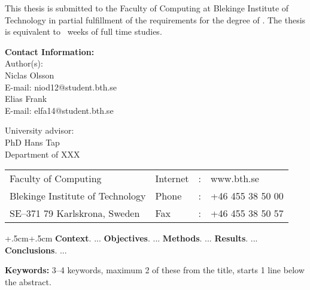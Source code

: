 \documentclass[a4paper,oneside]{bth}
\begin{document}
{\pagestyle{empty}
\changepage{5cm}{1cm}{-0.5cm}{-0.5cm}{}{-2cm}{}{}{}
\noindent
{\small
This thesis is submitted to the Faculty of Computing at Blekinge Institute
of Technology in partial fulfillment of the requirements for the degree of
\thesisDegree. The thesis is equivalent to \thesisWeeks\ 
weeks of full time studies.
}

\vspace{15cm}

\noindent
\textbf{Contact Information:} \\
Author(s): \\
Niclas Olsson \\
E-mail: niod12@student.bth.se \\
Elias Frank \\
E-mail: elfa14@student.bth.se

\vspace{2cm}

\noindent
University advisor: \\
PhD Hans Tap \\
Department of XXX


\vspace*{\fill}

\noindent
\begin{tabular}{@{}p{} l c l}
Faculty of Computing             & Internet & : & www.bth.se \\
Blekinge Institute of Technology & Phone    & : & +46 455 38 50 00 \\
SE--371 79 Karlskrona, Sweden    & Fax      & : & +46 455 38 50 57 \\
\end{tabular}
\clearpage
} %

\setcounter{page}{1}

\abstract
\begin{changemargin}{+.5cm}{+.5cm}
\noindent
\textbf{Context}. ... \newline
\textbf{Objectives}. ... \newline
\textbf{Methods}. ... \newline
\textbf{Results}. ... \newline
\textbf{Conclusions}. ...

\vspace {1cm}
\noindent
\textbf{Keywords:} 3--4 keywords, maximum 2 of these from the title, starts 1 line
below the abstract.

\end{changemargin}
\end{document}
